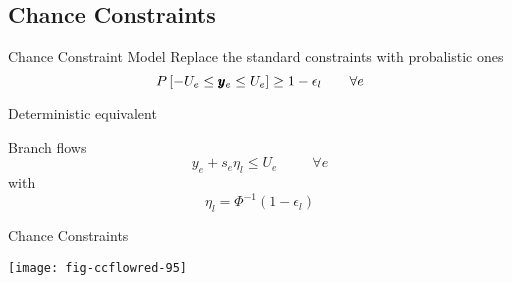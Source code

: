 \subsection{Chance Constraints}

\begin{frame}{Chance Constraint Model}
Replace the standard constraints with probalistic ones \footnotemark \footnotemark
\[ P \left[ -U_e \leq \pmb{y}_e \leq U_e \right] \geq 1- \epsilon_l \hspace{20pt} \forall e\] 

\pause
\alert{Deterministic equivalent}


Branch flows
\[ y_e + s_e \eta_l \leq  U_e  \hspace{30pt} \forall e    \]
with
\[ \eta_l = \Phi^{-1}(1 - \epsilon_l) \]








\end{frame}


\begin{frame}{Chance Constraints}

\begin{center}
\texttt{[image: fig-ccflowred-95]}
\end{center}


\end{frame}
